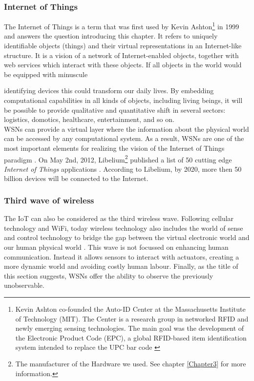\subsubsection{Internet of Things}
The Internet of Things is a term that was first used by Kevin Ashton\footnote{Kevin Ashton co-founded the Auto-ID Center at the  Massachusetts Institute of Technology (MIT). The Center is a research group in networked RFID and newly emerging sensing technologies. The main goal was the development of the Electronic Product Code (EPC), a global RFID-based item identification system intended to replace the UPC bar code \citep{AUTO}} in 1999 and answers the question introducing this chapter. It refers to uniquely identifiable objects (things) and their virtual representations in an Internet-like structure. It is a vision of a network of Internet-enabled objects, together with web services which interact with these objects. If all objects in the world would be equipped with minuscule \begin{figure}
\vfill
\end{figure}identifying devices this could transform our daily lives. By embedding computational capabilities in all kinds of objects, including living beings, it will be possible to provide qualitative and quantitative shift in several sectors: logistics, domotics, healthcare, entertainment, and so on.\\
WSNs can provide a virtual layer where the information about the physical world can be accessed by any computational system. As a result, WSNs are one of the most important elements for realizing the vision of the Internet of Things paradigm \citep{ALCA}. On May 2nd, 2012, Libelium\footnote{The manufacturer of the Hardware we used. See chapter \ref{Chapter3} for more information.} published a list of 50 cutting edge \emph{Internet of Things} applications . According to Libelium, by 2020, more then 50 billion devices will be connected to the Internet.\\
\subsubsection{Third wave of wireless}
The IoT can also be considered as the third wireless wave. Following cellular technology and WiFi, today wireless technology also includes the world of sense and control technology to bridge the gap between the virtual electronic world and our human physical world \citep{ATLANTIC}. This wave is not focussed on enhancing human communication. Instead it allows sensors to interact with actuators, creating a more dynamic world and avoiding costly human labour. Finally, as the title of this section suggests, WSNs offer the ability to observe the previously unobservable.
